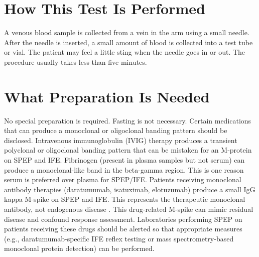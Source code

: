 \section*{How This Test Is Performed}
A venous blood sample is collected from a vein in the arm using a small needle. After the needle is inserted, a small amount of blood is collected into a test tube or vial. The patient may feel a little sting when the needle goes in or out. The procedure usually takes less than five minutes.

\section*{What Preparation Is Needed}
No special preparation is required. Fasting is not necessary. Certain medications that can produce a monoclonal or oligoclonal banding pattern should be disclosed. Intravenous immunoglobulin (IVIG) therapy produces a transient polyclonal or oligoclonal banding pattern that can be mistaken for an M-protein on SPEP and IFE. Fibrinogen (present in plasma samples but not serum) can produce a monoclonal-like band in the beta-gamma region. This is one reason serum is preferred over plasma for SPEP/IFE. Patients receiving monoclonal antibody therapies (daratumumab, isatuximab, elotuzumab) produce a small IgG kappa M-spike on SPEP and IFE. This represents the therapeutic monoclonal antibody, not endogenous disease \cite{mccudden2010interference}. This drug-related M-spike can mimic residual disease and confound response assessment. Laboratories performing SPEP on patients receiving these drugs should be alerted so that appropriate measures (e.g., daratumumab-specific IFE reflex testing or mass spectrometry-based monoclonal protein detection) can be performed.

